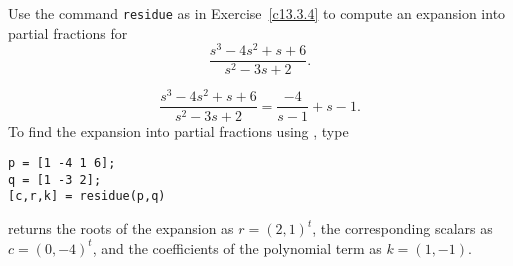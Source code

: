\documentclass{ximera}
\begin{document}
\begin{exercise} \label{c13.3.4b}
Use the command {\tt residue} as in Exercise~\ref{c13.3.4} to compute an 
expansion into partial fractions for
\[
\frac{s^3-4s^2+s+6}{s^2-3s+2}.
\]

\begin{solution}

\ans
\[
\frac{s^3 - 4s^2 + s + 6}{s^2 - 3s + 2}
= \frac{-4}{s - 1} + s - 1.
\]
\soln To find the expansion into partial fractions using \Matlabp, type
\begin{verbatim}
p = [1 -4 1 6];
q = [1 -3 2];
[c,r,k] = residue(p,q)
\end{verbatim}
\Matlab returns the roots of the expansion as $r = (2,1)^t$, the
corresponding scalars as $c = (0,-4)^t$, and the coefficients of the
polynomial term as $k = (1,-1)$.




\end{solution}
\end{exercise}
\end{document}
